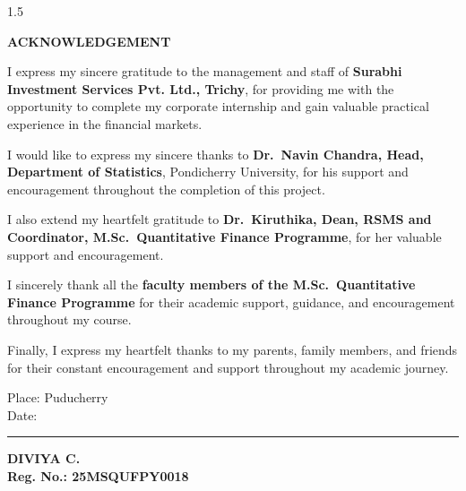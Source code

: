 \documentclass[11pt,oneside]{report}
\begin{document}
\newpage
\thispagestyle{plain}
{}
\begin{spacing}{1.5}
\begin{center}
    \textbf{\Large ACKNOWLEDGEMENT} \\[0.5cm]
\end{center}

\noindent
I express my sincere gratitude to the management and staff of \textbf{Surabhi Investment Services Pvt. Ltd., Trichy}, for providing me with the opportunity to complete my corporate internship and gain valuable practical experience in the financial markets.

\vspace{0.35cm}
\noindent
I would like to express my sincere thanks to \textbf{Dr.~Navin Chandra, Head, Department of Statistics}, Pondicherry \mbox{University}, for his support and encouragement throughout the completion of this project.

\vspace{0.35cm}
\noindent
I also extend my heartfelt gratitude to \textbf{Dr.~Kiruthika, Dean, RSMS and Coordinator, M.Sc.~Quantitative Finance Programme}, for her valuable support and encouragement.

\vspace{0.35cm}
\noindent
I sincerely thank all the \textbf{faculty members of the M.Sc.~Quantitative Finance Programme} for their academic support, guidance, and encouragement throughout my course.

\vspace{0.35cm}
\noindent
Finally, I express my heartfelt thanks to my parents, family members, and friends for their constant encouragement and support throughout my academic journey.

\vspace{2.5cm}
\noindent
\begin{minipage}{0.45\textwidth}
    Place: Puducherry \\
    Date: \rule{3.5cm}{0.4pt}
\end{minipage}
\hfill
\begin{minipage}{0.45\textwidth}
    \begin{flushright}
        \textbf{DIVIYA C.} \\
        \textbf{Reg. No.: 25MSQUFPY0018}
    \end{flushright}
\end{minipage}
\end{spacing}
\end{document}
